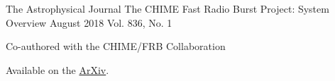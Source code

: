 \begin{cventries}
  \cventry
    {The Astrophysical Journal} %
    {The CHIME Fast Radio Burst Project: System Overview} %
    {August 2018} %
    {Vol. 836, No. 1} %
    {
      \begin{cvitems} %
        \item {Co-authored with the CHIME/FRB Collaboration}
        \item {Available on the \href{https://arxiv.org/abs/1803.11235}{ArXiv}.}
      \end{cvitems}
    }


\end{cventries}
